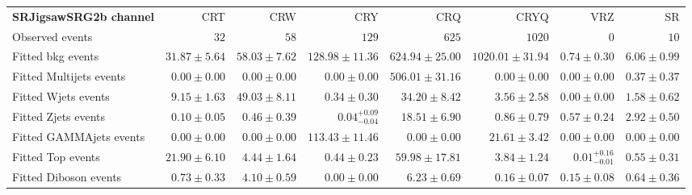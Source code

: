 

\begin{table}
\begin{center}
\setlength{\tabcolsep}{0.0pc}
{\tiny
\begin{tabular*}{\textwidth}{@{\extracolsep{\fill}}lrrrrrrr}
\noalign{\smallskip}\hline\noalign{\smallskip}
{\bf SRJigsawSRG2b channel}           & CRT            & CRW            & CRY            & CRQ            & CRYQ            & VRZ            & SR              \\[-0.05cm]
\noalign{\smallskip}\hline\noalign{\smallskip}
Observed events          & $32$              & $58$              & $129$              & $625$              & $1020$              & $0$              & $10$                    \\
\noalign{\smallskip}\hline\noalign{\smallskip}
Fitted bkg events         & $31.87 \pm 5.64$          & $58.03 \pm 7.62$          & $128.98 \pm 11.36$          & $624.94 \pm 25.00$          & $1020.01 \pm 31.94$          & $0.74 \pm 0.30$          & $6.06 \pm 0.99$              \\
\noalign{\smallskip}\hline\noalign{\smallskip}
        Fitted Multijets events         & $0.00 \pm 0.00$          & $0.00 \pm 0.00$          & $0.00 \pm 0.00$          & $506.01 \pm 31.16$          & $0.00 \pm 0.00$          & $0.00 \pm 0.00$          & $0.37 \pm 0.37$              \\
        Fitted Wjets events         & $9.15 \pm 1.63$          & $49.03 \pm 8.11$          & $0.34 \pm 0.30$          & $34.20 \pm 8.42$          & $3.56 \pm 2.58$          & $0.00 \pm 0.00$          & $1.58 \pm 0.62$              \\
        Fitted Zjets events         & $0.10 \pm 0.05$          & $0.46 \pm 0.39$          & $0.04_{-0.04}^{+0.09}$          & $18.51 \pm 6.90$          & $0.86 \pm 0.79$          & $0.57 \pm 0.24$          & $2.92 \pm 0.50$              \\
        Fitted GAMMAjets events         & $0.00 \pm 0.00$          & $0.00 \pm 0.00$          & $113.43 \pm 11.46$          & $0.00 \pm 0.00$          & $21.61 \pm 3.42$          & $0.00 \pm 0.00$          & $0.00 \pm 0.00$              \\
        Fitted Top events         & $21.90 \pm 6.10$          & $4.44 \pm 1.64$          & $0.44 \pm 0.23$          & $59.98 \pm 17.81$          & $3.84 \pm 1.24$          & $0.01_{-0.01}^{+0.16}$          & $0.55 \pm 0.31$              \\
        Fitted Diboson events         & $0.73 \pm 0.33$          & $4.10 \pm 0.59$          & $0.00 \pm 0.00$          & $6.23 \pm 0.69$          & $0.16 \pm 0.07$          & $0.15 \pm 0.08$          & $0.64 \pm 0.36$              \\

\end{tabular*}}
\end{center}
\end{table}
